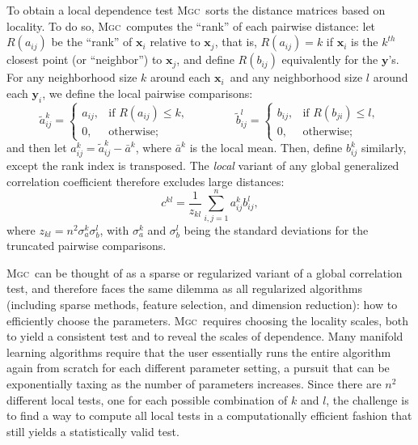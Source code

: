 \documentclass[11pt]{article}
\providecommand{\sct}[1]{{\normalfont\textsc{#1}}}
\providecommand{\mt}[1]{\widetilde{#1}}
\providecommand{\mb}[1]{\boldsymbol{#1}}
\newcommand{\G}{c}
\newcommand{\Mgc}{\sct{Mgc}}
\newcommand{\mby}{\ensuremath{\mb{y}}}
\begin{document}
To obtain a local dependence test 
\Mgc~sorts the distance matrices based on locality.
To do so, \Mgc~computes the ``rank'' of each pairwise distance: 
let $R(a_{ij})$  be the ``rank'' of $\mb{x}_i$ relative to $\mb{x}_j$, that is, $R(a_{ij})=k$ if $\mb{x}_i$ is the $k^{th}$ closest point (or ``neighbor'') to $\mb{x}_j$, and define $R(b_{ij})$ equivalently for the \mby's. For any neighborhood size $k$ around each $\mb{x}_i$~and any neighborhood size $l$ around each $\mb{y}_i$, we define the local pairwise comparisons:
\begin{equation}
\label{localCoef2}
    \mt{a}_{ij}^k=
    \begin{cases}
      a_{ij}, & \text{if } R(a_{ij}) \leq k, \\
      0, & \text{otherwise};
    \end{cases} \qquad \qquad
    \mt{b}_{ij}^l=
    \begin{cases}
      b_{ij}, & \text{if } R(b_{ji}) \leq l, \\
      0, & \text{otherwise};
    \end{cases}
\end{equation}
and then let $a^k_{ij}=\mt{a}^k_{ij} - \bar{a}^k$, 
where $\bar{a}^k$ is the local mean. Then, define $b^k_{ij}$ similarly, except the rank index is transposed. 
The \emph{local} variant of any global generalized correlation coefficient therefore  excludes large distances: %
\begin{equation}
\label{localCoef}
\G^{kl}=\dfrac{1}{z_{kl}} {\textstyle \sum_{i,j=1}^n a_{ij}^k b_{ij}^l},
\end{equation}
where $z_{kl}=n^2 \sigma_a^k \sigma_b^l$,  with $\sigma_a^k$ and $\sigma_b^{l}$ being the standard deviations for the truncated pairwise comparisons. 


\Mgc~can be thought of as a sparse or regularized variant of a global correlation test, and therefore faces the same dilemma as all regularized algorithms (including sparse methods, feature selection, and dimension reduction): how to efficiently choose the parameters. \Mgc~requires choosing the locality scales, both to yield a consistent test and to reveal the scales of dependence.  
Many manifold learning algorithms require that the user essentially runs the entire algorithm again from scratch for each different parameter setting, a pursuit that can be exponentially taxing as the number of parameters increases.  
Since there are $n^2$ different local tests, one for each possible combination of $k$ and $l$, the challenge is to find a way to compute all local tests in a computationally efficient fashion that still yields a statistically valid test. 
\end{document}
